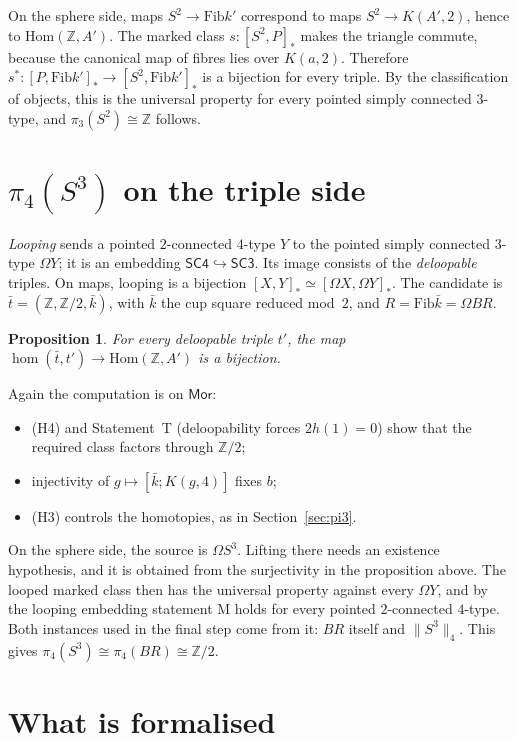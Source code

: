 \documentclass[11pt]{amsart}
\newtheorem{proposition}[theorem]{Proposition}
\theoremstyle{remark}
\newcommand{\Om}{\Omega}
\newcommand{\Fib}{\mathrm{Fib}}
\newcommand{\Mor}{\mathsf{Mor}}
\newcommand{\Hom}{\mathrm{Hom}}
\newcommand{\SCt}{\mathsf{SC3}}
\newcommand{\SCf}{\mathsf{SC4}}
\newcommand{\Z}{\mathbb{Z}}
\newcommand{\cmp}{\mathbin{;}}
\begin{document}
On the sphere side, maps $S^2\to\Fib k'$ correspond to maps $S^2\to K(A',2)$,
hence to $\Hom(\Z,A')$. The marked class $s:[S^2,P]_*$ makes the triangle
commute, because the canonical map of fibres lies over $K(a,2)$. Therefore
$s^*:[P,\Fib k']_*\to[S^2,\Fib k']_*$ is a bijection for every triple. By the
classification of objects, this is the universal property for every pointed
simply connected $3$-type, and $\pi_3(S^2)\cong\Z$ follows.

\section{$\pi_4(S^3)$ on the triple side}\label{sec:pi4}

\emph{Looping} sends a pointed $2$-connected $4$-type $Y$ to the pointed simply
connected $3$-type $\Om Y$; it is an embedding $\SCf\hookrightarrow\SCt$. Its
image consists of the \emph{deloopable} triples. On maps, looping is a bijection
$[X,Y]_*\simeq[\Om X,\Om Y]_*$. The candidate is $\bar t=(\Z,\Z/2,\bar k)$, with
$\bar k$ the cup square reduced mod~$2$, and $R=\Fib\bar k=\Om BR$.

\begin{proposition}
For every deloopable triple $t'$, the map $\hom(\bar t,t')\to\Hom(\Z,A')$ is a
bijection.
\end{proposition}

Again the computation is on $\Mor$:
\begin{itemize}
\item (H4) and Statement~T (deloopability forces $2h(1)=0$) show that the
required class factors through $\Z/2$;
\item injectivity of $g\mapsto[\bar k\cmp K(g,4)]$ fixes $b$;
\item (H3) controls the homotopies, as in Section~\ref{sec:pi3}.
\end{itemize}
On the sphere side, the source is $\Om S^3$. Lifting there needs an existence
hypothesis, and it is obtained from the surjectivity in the proposition above. The looped
marked class then has the universal property against every $\Om Y$, and by the
looping embedding statement M holds for every pointed $2$-connected $4$-type.
Both instances used in the final step come from it: $BR$ itself and
$\|S^3\|_4$. This gives $\pi_4(S^3)\cong\pi_4(BR)\cong\Z/2$.

\section{What is formalised}
\raggedright
\end{document}
